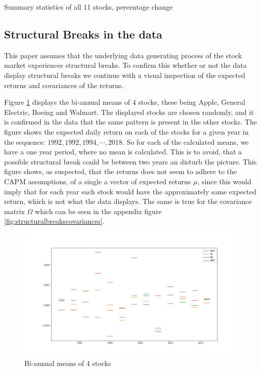\begin{table}[ht]
\centering
\caption{Summary statistics of all 11 stocks, percentage change}

\label{tab:cleandata}
\end{table}

\subsection{Structural Breaks in the data}


This paper assumes that the underlying data generating process of the stock market experiences structural breaks. To confirm this whether or not the data display structural breaks we continue with a visual inspection of the expected returns and covariances of the returns.

Figure \ref{fig:structuralbreaksmeans} displays the bi-annual means of 4 stocks, these being Apple, General Electric, Boeing and Walmart. The displayed stocks are chosen randomly, and it is confirmed in the data that the same pattern is present in the other stocks. The figure shows the expected daily return on each of the stocks for a given year in the sequence: $1992, 1992, 1994, \cdots, 2018$. So for each of the calculated means, we have a one year period, where no mean is calculated. This is to avoid, that a possible structural break could be between two years an disturb the picture. This figure shows, as suspected, that the returns does not seem to adhere to the CAPM assumptions, of a single a vector of expected returns $\mu$, since this would imply that for each year each stock would have the approximately same expected return, which is not what the data displays. The same is true for the covariance matrix $\Omega$ which can be seen in the appendix figure \ref{fig:structuralbreakscovariances}.

\begin{figure}[ht]
\centering
\includegraphics[scale=0.45]{figures/structural_breaks_means.png}
\caption{Bi-annual means of 4 stocks}
\label{fig:structuralbreaksmeans}
\end{figure}

